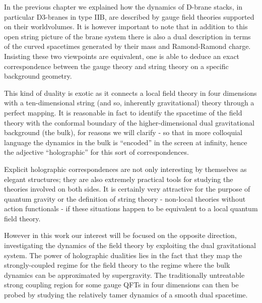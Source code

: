 
In the previous chapter we explained how the dynamics of D-brane stacks, in particular D3-branes in type IIB, are described by gauge field theories supported on their worldvolumes. It is however important to note that in addition to this open string picture of the brane system there is also a dual description in terms of the curved spacetimes generated by their mass and Ramond-Ramond charge. Insisting these two viewpoints are equivalent, one is able to deduce an exact correspondence between the gauge theory and string theory on a specific background geometry.

This kind of duality is exotic as it connects a local field theory in four dimensions with a ten-dimensional string (and so, inherently gravitational) theory through a perfect mapping. It is reasonable in fact to identify the spacetime of the field theory with the conformal boundary of the higher-dimensional dual gravitational background (the bulk), for reasons we will clarify - so that in more colloquial language the dynamics in the bulk is ``encoded'' in the screen at infinity, hence the adjective ``holographic'' for this sort of correspondences.

Explicit holographic correspondences are not only interesting by themselves as elegant structures; they are also extremely practical tools for studying the theories involved on both sides. It is certainly very attractive for the purpose of quantum gravity or the definition of string theory - non-local theories without action functionals - if these situations happen to be equivalent to a local quantum field theory.


However in this work our interest will be focused on the opposite direction, investigating the dynamics of the field theory by exploiting the dual gravitational system. The power of holographic dualities lies in the fact that they map the strongly-coupled regime for the field theory to the regime where the bulk dynamics can be approximated by supergravity. The traditionally untreatable strong coupling region for some gauge QFTs in four dimensions can then be probed by studying the relatively tamer dynamics of a smooth dual spacetime.



